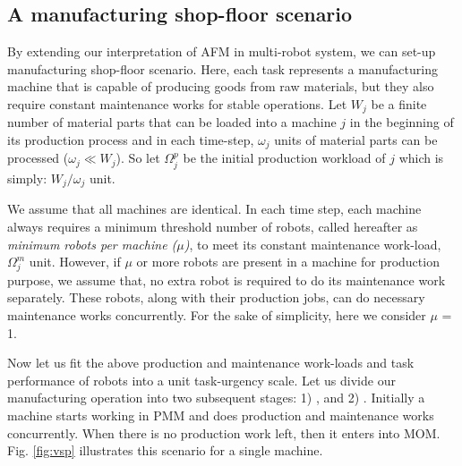 \documentclass[preprint,12pt]{elsarticle}
\begin{document}
\subsection{A manufacturing shop-floor scenario}
\label{afm:vms}
By extending our interpretation of AFM in multi-robot system, we can set-up manufacturing shop-floor  scenario. Here, each task represents a manufacturing machine that is  capable of producing goods from raw materials, but they also require constant maintenance works for stable operations. Let $W_{j}$ be a finite number of material parts that can be loaded into a machine $j$ in the beginning of its production process and in each time-step, $\omega_{j}$ units of material parts can be processed  ($\omega_{j} \ll W_{j} $). So let $\Omega_{j}^{p}$ be the initial production workload of $j$ which is simply: $W_{j} / \omega_{j}$ unit.

We assume that all machines are identical. In each time step, each machine always requires a minimum threshold number of robots, called hereafter as {\em minimum robots per machine ($\mu$)}, to meet its constant maintenance work-load, $\Omega_{j}^{m}$ unit. However, if $\mu$ or more robots are present in a machine for production purpose, we assume that, no extra robot is required to do its maintenance work separately. These robots, along with their production jobs, can do necessary maintenance works concurrently. For the sake of simplicity, here we consider $\mu$ = 1.

Now let us fit the above production and maintenance work-loads and task performance of robots into a unit task-urgency scale. Let us divide our manufacturing operation into two subsequent stages: 1) , and 2) . Initially a machine starts working in PMM and does production and maintenance works concurrently. When there is no production work left, then it  enters into MOM. Fig. \ref{fig:vsp} illustrates this scenario for a single machine.
\end{document}
